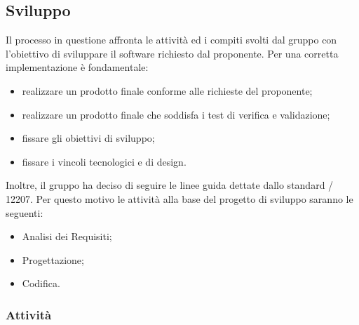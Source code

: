 \subsection{Sviluppo}
Il processo in questione affronta le attività ed i compiti svolti dal gruppo con l'obiettivo di sviluppare il software richiesto dal proponente. Per una corretta implementazione è fondamentale:
\begin{itemize}
		\item realizzare un prodotto finale conforme alle richieste del proponente;
		\item realizzare un prodotto finale che soddisfa i test di verifica e validazione;
		\item fissare gli obiettivi di sviluppo;
		\item fissare i vincoli tecnologici e di design.
\end{itemize}
Inoltre, il gruppo ha deciso di seguire le linee guida dettate dallo standard / 12207. Per questo motivo le attività alla base del progetto di sviluppo saranno le seguenti:
\begin{itemize}
	\item Analisi dei Requisiti;
	\item Progettazione;
	\item Codifica.
\end{itemize}
\subsubsection{Attività}
